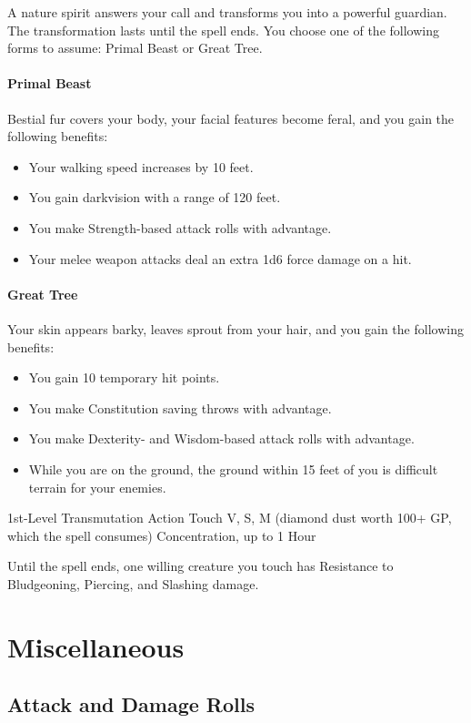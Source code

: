 \documentclass[letterpaper,openany,oneside,twocolumn]{book}
\begin{document}
A nature spirit answers your call and transforms you into a powerful guardian. The transformation lasts until the spell ends. You choose one of the following forms to assume: Primal Beast or Great Tree.

\paragraph*{Primal Beast} Bestial fur covers your body, your facial features become feral, and you gain the following benefits:
\begin{itemize}
	\item Your walking speed increases by 10 feet.
	\item You gain darkvision with a range of 120 feet.
	\item You make Strength-based attack rolls with advantage.
	\item Your melee weapon attacks deal an extra 1d6 force damage on a hit.
\end{itemize}

\paragraph*{Great Tree} Your skin appears barky, leaves sprout from your hair, and you gain the following benefits:
\begin{itemize}
	\item You gain 10 temporary hit points.
	\item You make Constitution saving throws with advantage.
	\item You make Dexterity- and Wisdom-based attack rolls with advantage.
	\item While you are on the ground, the ground within 15 feet of you is difficult terrain for your enemies.
\end{itemize}

	{1st-Level Transmutation}
	{Action}
	{Touch}
	{V, S, M (diamond dust worth 100+ GP, which the spell consumes)}
	{Concentration, up to 1 Hour}

Until the spell ends, one willing creature you touch has Resistance to Bludgeoning, Piercing, and Slashing damage.

\vfill\eject
\section*{Miscellaneous}
\subsection*{Attack and Damage Rolls}
\end{document}
